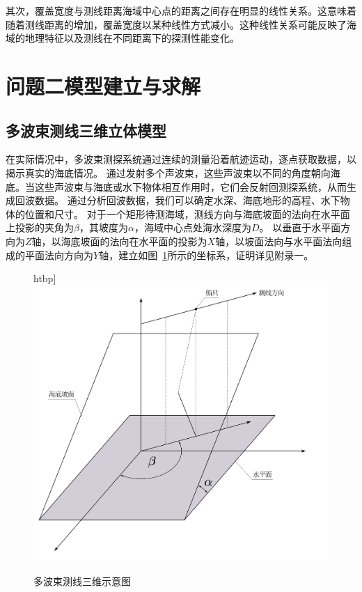 \documentclass[withoutpreface,bwprint]{cumcmthesis} %
\begin{document}
    其次，覆盖宽度与测线距离海域中心点的距离之间存在明显的线性关系。这意味着随着测线距离的增加，覆盖宽度以某种线性方式减小。这种线性关系可能反映了海域的地理特征以及测线在不同距离下的探测性能变化。
    
    

    \section{问题二模型建立与求解}
    \subsection{多波束测线三维立体模型}
    在实际情况中，多波束测探系统通过连续的测量沿着航迹运动，逐点获取数据，以揭示真实的海底情况。
    通过发射多个声波束，这些声波束以不同的角度朝向海底。当这些声波束与海底或水下物体相互作用时，它们会反射回测探系统，从而生成回波数据。
    通过分析回波数据，我们可以确定水深、海底地形的高程、水下物体的位置和尺寸。
    对于一个矩形待测海域，测线方向与海底坡面的法向在水平面上投影的夹角为$\beta$，其坡度为$\alpha$，海域中心点处海水深度为$D$。
    以垂直于水平面方向为$Z$轴，以海底坡面的法向在水平面的投影为$X$轴，以坡面法向与水平面法向组成的平面法向方向为$Y$轴，建立如图~\ref{8}所示的坐标系，证明详见附录一。
    
    \begin{figure}htbp]
        \centering
        \includegraphics[width=.6\textwidth]{矩形多波束.png}
        \caption{多波束测线三维示意图}
        \label{8}
    \end{figure}

\end{document}
